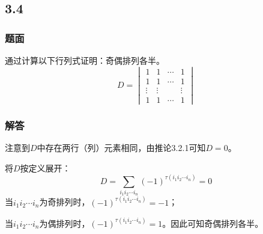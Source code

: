 \documentclass[10pt,xcolor=svgnames]{beamer} %
\begin{document}
\subsection*{3.4}
\begin{frame}
    \frametitle{题面}
    通过计算以下行列式证明：奇偶排列各半。
    \begin{equation*}
        D=
        \begin{vmatrix}
            1      & 1      & \cdots & 1      \\
            1      & 1      & \cdots & 1      \\
            \vdots & \vdots &        & \vdots \\
            1      & 1      & \cdots & 1
        \end{vmatrix}
    \end{equation*}
\end{frame}
\begin{frame}
    \frametitle{解答}
    注意到\(D\)中存在两行（列）元素相同，由推论3.2.1可知\(D=0\)。

    将\(D\)按定义展开：
    \begin{equation*}
        D=\sum_{i_1i_2\cdots i_n}(-1)^{\tau(i_1i_2\cdots i_n)}=0
    \end{equation*}
    当\(i_1i_2\cdots i_n\)为奇排列时，\((-1)^{\tau(i_1i_2\cdots i_n)}=-1\)；

    当\(i_1i_2\cdots i_n\)为偶排列时，\((-1)^{\tau(i_1i_2\cdots i_n)}=1\)。因此可知奇偶排列各半。
\end{frame}
\end{document}
